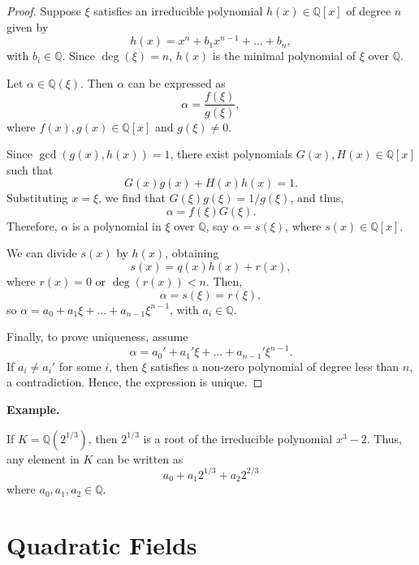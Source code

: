 \documentclass{article}
\newenvironment{example}{%
    \par
    \vspace{5pt}
	\begin{minipage}{\textwidth}
		\noindent\textbf{Example.}
		\tcolorbox[blanker,breakable,left=5mm,parbox=false,
	    before upper={\parindent15pt},
	    after skip=10pt,
		borderline west={1mm}{0pt}{cyan!10!white}]
}{%
		\endtcolorbox
	\end{minipage}
    \vspace{5pt}
}
\begin{document}
\begin{proof}
    Suppose $\xi$ satisfies an irreducible polynomial $h(x) \in \mathbb{Q}[x]$ of degree $n$ given by
    \[
    h(x) = x^n + b_1 x^{n-1} + \dots + b_n,
    \]
    with $b_i \in \mathbb{Q}$. Since $\deg(\xi) = n$, $h(x)$ is the minimal polynomial of $\xi$ over $\mathbb{Q}$.

    Let $\alpha \in \mathbb{Q}(\xi)$. Then $\alpha$ can be expressed as
    \[
    \alpha = \frac{f(\xi)}{g(\xi)},
    \]
    where $f(x), g(x) \in \mathbb{Q}[x]$ and $g(\xi) \neq 0$.

    Since $\gcd(g(x), h(x)) = 1$, there exist polynomials $G(x), H(x) \in \mathbb{Q}[x]$ such that
    \[
    G(x)g(x) + H(x)h(x) = 1.
    \]
    Substituting $x = \xi$, we find that $G(\xi)g(\xi) = 1/g(\xi)$, and thus,
    \[
    \alpha = f(\xi)G(\xi).
    \]
    Therefore, $\alpha$ is a polynomial in $\xi$ over $\mathbb{Q}$, say $\alpha = s(\xi)$, where $s(x) \in \mathbb{Q}[x]$.

    We can divide $s(x)$ by $h(x)$, obtaining
    \[
    s(x) = q(x)h(x) + r(x),
    \]
    where $r(x) = 0$ or $\deg(r(x)) < n$. Then,
    \[
    \alpha = s(\xi) = r(\xi),
    \]
    so $\alpha = a_0 + a_1 \xi + \dots + a_{n-1} \xi^{n-1}$, with $a_i \in \mathbb{Q}$.

    Finally, to prove uniqueness, assume
    \[
    \alpha = a_0' + a_1' \xi + \dots + a_{n-1}' \xi^{n-1}.
    \]
    If \(a_i \neq a_i'\) for some \(i\), then \(\xi\) satisfies a non-zero polynomial of degree less than \(n\), a contradiction. Hence, the expression is unique.
\end{proof}

\begin{example}
If $K = \mathbb{Q}(2^{1/3})$, then $2^{1/3}$ is a root of the irreducible polynomial $x^3 - 2$. Thus, any element in $K$ can be written as
\[
a_0 + a_1 2^{1/3} + a_2 2^{2/3}
\]
where $a_0, a_1, a_2 \in \mathbb{Q}$.
\end{example}

\section{Quadratic Fields}

\end{document}
